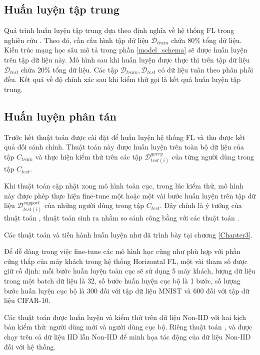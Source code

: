 \subsection{Huấn luyện tập trung}

Quá trình huấn luyện tập trung dựa theo định nghĩa về hệ thống FL trong nghiên cứu \cite{yin2021comprehensive}. Theo đó, cần cấu hình tập dữ liệu $\mathcal{D}_{train}$ chứa 80\% tổng dữ liệu. Kiến trúc mạng học sâu mô tả trong phần \ref{model_schema} sẽ được huấn luyện trên tập dữ liệu này. Mô hình sau khi huấn luyện được thực thi trên tập dữ liệu $\mathcal{D}_{test}$ chứa 20\% tổng dữ liệu. Các tập $\mathcal{D}_{train}, \mathcal{D}_{test}$ có dữ liệu tuân theo phân phối đều. Kết quả về độ chính xác sau khi kiểm thử gọi là kết quả huấn luyện tập trung.

\subsection{Huấn luyện phân tán}

Trước hết thuật toán  được cài đặt để huấn luyện hệ thống FL và thu được kết quả đối sánh chính. Thuật toán này được huấn luyện trên toàn bộ dữ liệu của tập $C_{train}$ và thực hiện kiểm thử trên các tập $\mathcal{D}_{test(i)}^{query}$ của từng người dùng trong tập $C_{test}$.

Khi thuật toán  cập nhật xong mô hình toàn cục, trong lúc kiểm thử, mô hình này được phép thực hiện fine-tune một hoặc một vài bước huấn luyện trên tập dữ liệu $\mathcal{D}_{test(i)}^{support}$ của những người dùng trong tập $C_{test}$. Đây chính là ý tưởng của thuật toán , thuật toán sinh ra nhằm so sánh công bằng với các thuật toán .

Các thuật toán  và  tiến hành huấn luyện như đã trình bày tại chương \ref{Chapter3}.

Để dễ dàng trong việc fine-tune các mô hình học cũng như phù hợp với phần cứng thấp của máy khách trong hệ thống Horizontal FL, một vài tham số được giữ cố định: mỗi bước huấn luyện toàn cục sẽ sử dụng 5 máy khách, lượng dữ liệu trong một batch dữ liệu là 32, số bước huấn luyện cục bộ là 1 bước, số lượng bước huấn luyện cục bộ là 300 đối với tập dữ liệu MNIST và 600 đối với tập dữ liệu CIFAR-10.

Các thuật toán được huấn luyện và kiểm thử trên dữ liệu Non-IID với hai kịch bản kiểm thử: người dùng mới và người dùng cục bộ. Riêng thuật toán ,  và  được chạy trên cả dữ liệu IID lẫn Non-IID để minh họa tác động của dữ liệu Non-IID đối với hệ thống.

